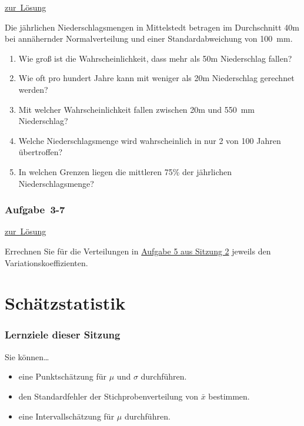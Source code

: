 \documentclass[
  11pt,
  ngerman,
  a4paper,
]{report}
\providecommand{\tightlist}{%
  \setlength{\itemsep}{0pt}\setlength{\parskip}{0pt}}
\begin{document}
\protect\hyperlink{loesung-3-6}{zur~Lösung}

Die jährlichen Niederschlagsmengen in Mittelstedt betragen im Durchschnitt 40m bei annähernder Normalverteilung und einer Standardabweichung von 100~mm.

\begin{enumerate}
\def\labelenumi{\alph{enumi})}
\tightlist
\item
  Wie groß ist die Wahrscheinlichkeit, dass mehr als 50m Niederschlag fallen?
\item
  Wie oft pro hundert Jahre kann mit weniger als 20m Niederschlag gerechnet werden?
\item
  Mit welcher Wahrscheinlichkeit fallen zwischen 20m und 550~mm Niederschlag?
\item
  Welche Niederschlagsmenge wird wahrscheinlich in nur 2 von 100 Jahren übertroffen?
\item
  In welchen Grenzen liegen die mittleren 75\% der jährlichen Niederschlagsmenge?
\end{enumerate}

\hypertarget{aufgabe-3-7}{%
\subsection{Aufgabe~3-7}\label{aufgabe-3-7}}

\protect\hyperlink{loesung-3-7}{zur~Lösung}

Errechnen Sie für die Verteilungen in \protect\hyperlink{aufgabe-2-5}{Aufgabe 5 aus Sitzung 2} jeweils den Variationskoeffizienten.

\hypertarget{schuxe4tzstatistik}{%
\chapter{Schätzstatistik}\label{schuxe4tzstatistik}}

\hypertarget{lernziele-dieser-sitzung-3}{%
\subsection*{Lernziele dieser Sitzung}\label{lernziele-dieser-sitzung-3}}

Sie können\ldots{}

\begin{itemize}
\tightlist
\item
  eine Punktschätzung für \(\mu\) und \(\sigma\) durchführen.
\item
  den Standardfehler der Stichprobenverteilung von \(\bar{x}\) bestimmen.
\item
  eine Intervallschätzung für \(\mu\) durchführen.
\end{itemize}
\end{document}
